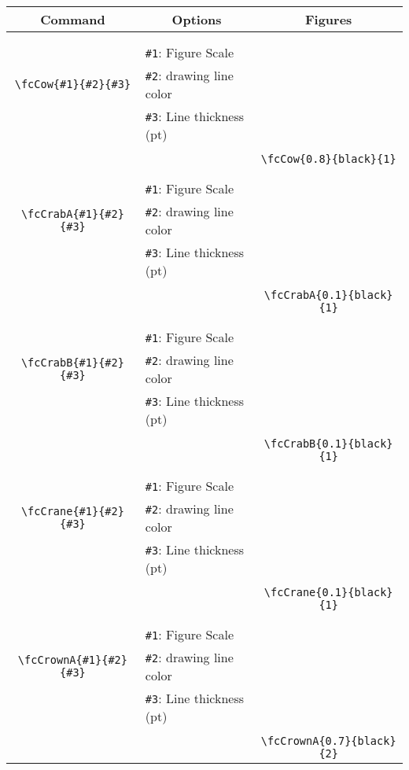 \documentclass[x11names]{article}
\begin{document}
\begin{table}[H]\centering\begin{tabular}{|c|l|c|}\hline {\bf Command}& \multicolumn{1}{c|}{{\bf Options}} & {\bf Figures}\\  \hline	&&\multirow{5}{*}{\fcCow{0.8}{black}{1}}\\	&&\\	&\verb|#1|: Figure Scale &\\	\verb|\fcCow{#1}{#2}{#3}|&	\verb|#2|: drawing line color &\\	&\verb|#3|: Line thickness (pt) &\\ &&\\&&	\verb|\fcCow{0.8}{black}{1}|\\\hline 	
	&&\multirow{5}{*}{\fcCrabA{0.1}{black}{1}}\\	&&\\	&\verb|#1|: Figure Scale &\\	\verb|\fcCrabA{#1}{#2}{#3}|&	\verb|#2|: drawing line color &\\	&\verb|#3|: Line thickness (pt) &\\ &&\\&&	\verb|\fcCrabA{0.1}{black}{1}|\\\hline 	
	&&\multirow{5}{*}{\fcCrabB{0.1}{black}{1}}\\	&&\\	&\verb|#1|: Figure Scale &\\	\verb|\fcCrabB{#1}{#2}{#3}|&	\verb|#2|: drawing line color &\\	&\verb|#3|: Line thickness (pt) &\\ &&\\&&	\verb|\fcCrabB{0.1}{black}{1}|\\\hline 	
	&&\multirow{5}{*}{\fcCrane{0.1}{black}{1}}\\	&&\\	&\verb|#1|: Figure Scale &\\	\verb|\fcCrane{#1}{#2}{#3}|&	\verb|#2|: drawing line color &\\	&\verb|#3|: Line thickness (pt) &\\ &&\\&&	\verb|\fcCrane{0.1}{black}{1}|\\\hline 	
	&&\multirow{5}{*}{\fcCrownA{0.7}{black}{2}}\\	&&\\	&\verb|#1|: Figure Scale &\\	\verb|\fcCrownA{#1}{#2}{#3}|&	\verb|#2|: drawing line color &\\	&\verb|#3|: Line thickness (pt) &\\ &&\\&&	\verb|\fcCrownA{0.7}{black}{2}|\\\hline 	

\end{tabular}
\end{table}
\end{document}
